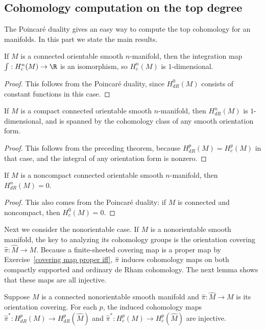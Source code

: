 \subsection{Cohomology computation on the top degree}
The Poincar\'e duality gives an easy way to compute the top cohomology for an manifolds. In this part we state the main results.
\begin{theorem}\label{cohomology n orientable compact supp}
If $M$ is a connected orientable smooth $n$-manifold, then the integration map $\int:H^n_c(M)\to\R$ is an isomorphism, so $H^n_c(M)$ is $1$-dimensional.
\end{theorem}
\begin{proof}
This follows from the Poincar\'e duality, since $H^0_{dR}(M)$ consists of constant functions in this case.
\end{proof}
\begin{theorem}\label{cohomology n orientable compact}
If $M$ is a compact connected orientable smooth $n$-manifold, then $H^n_{dR}(M)$ is $1$-dimensional, and is spanned by the cohomology class of any smooth orientation form.
\end{theorem}
\begin{proof}
This follows from the preceding theorem, because $H^p_{dR}(M)=H^p_c(M)$ in that case, and the integral of any orientation form is nonzero.
\end{proof}
\begin{theorem}\label{cohomology n orientable noncompact}
If $M$ is a noncompact connected orientable smooth $n$-manifold, then $H^n_{dR}(M)=0$.
\end{theorem}
\begin{proof}
This also comes from the Poincar\'e duality: if $M$ is connected and noncompact, then $H^0_c(M)=0$.
\end{proof}
Next we consider the nonorientable case. If $M$ is a nonorientable smooth manifold, the key to analyzing its cohomology groups is the orientation covering $\widehat{\pi}:\widehat{M}\to M$. Because a finite-sheeted covering map is a proper map by Exercise~\ref{covering map proper iff}, $\widehat{\pi}$ induces cohomology maps on both compactly supported and ordinary de Rham cohomology. The next lemma shows that these maps are all injective.
\begin{lemma}
Suppose $M$ is a connected nonorientable smooth manifold and $\widehat{\pi}:\widehat{M}\to M$ is its orientation covering. For each $p$, the induced cohomology maps $\widehat{\pi}^*:H^p_{dR}(M)\to H^p_{dR}(\widehat{M})$ and $\widehat{\pi}^*:H^p_{c}(M)\to H^p_{c}(\widehat{M})$ are injective.
\end{lemma}
